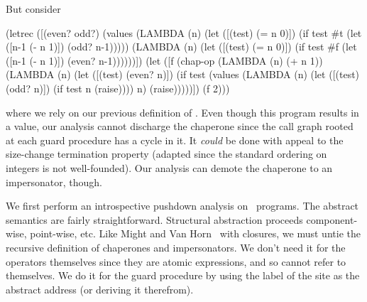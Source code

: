 But consider
\begin{schemedisplay}
(letrec ([(even? odd?) (values (LAMBDA (n)
			         (let ([(test) (= n 0)])
			           (if test
			               #t
			               (let ([n-1 (- n 1)])
			                 (odd? n-1)))))
			       (LAMBDA (n)
			         (let ([(test) (= n 0)])
			           (if test
			               #f
			               (let ([n-1 (- n 1)])
			                 (even? n-1))))))])
  (let ([f (chap-op (LAMBDA (n) (+ n 1))
                               (LAMBDA (n)
                                 (let ([(test) (even? n)])
                                   (if test
                                       (values (LAMBDA (n)
                                                 (let ([(test) (odd? n)])
                                                   (if test
                                                       n
                                                       (raise))))
                                               n)
                                       (raise)))))])
    (f 2)))
\end{schemedisplay}
where we rely on our previous definition of .
Even though this program results in a value, our analysis cannot discharge the chaperone since the call graph rooted at each guard procedure has a cycle in it.
It \emph{could} be done with appeal to the size-change termination property (adapted since the standard ordering on integers is not well-founded).
Our analysis can demote the chaperone to an impersonator, though.


We first perform an introspective pushdown analysis on \chapcalc\ programs.
The abstract semantics are fairly straightforward.
Structural abstraction proceeds component-wise, point-wise, etc.
Like Might and Van Horn~\cite{van2010abstracting} with closures, we must untie the recursive definition of chaperones and impersonators.
We don't need it for the operators themselves since they are atomic expressions, and so cannot refer to themselves.
We do it for the guard procedure by using the label of the site as the abstract address (or deriving it therefrom).

